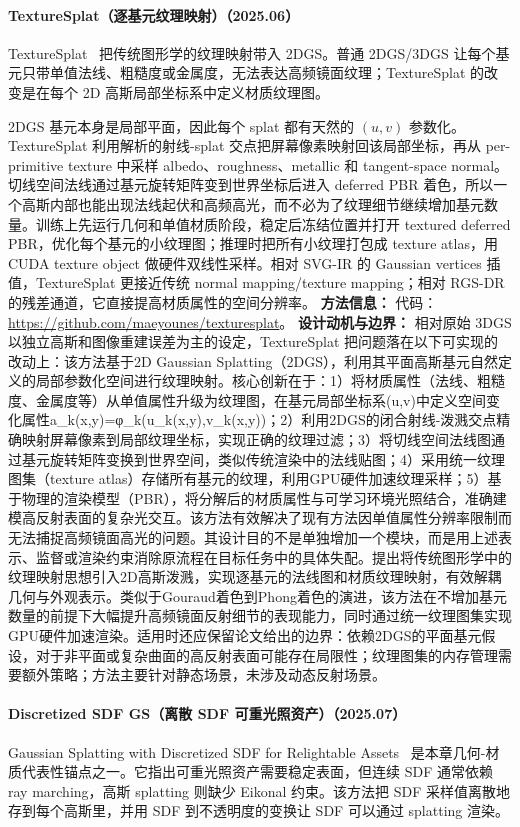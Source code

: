 \paragraph{TextureSplat（逐基元纹理映射）（2025.06）}
TextureSplat~\cite{2506_13348} 把传统图形学的纹理映射带入 2DGS。普通 2DGS/3DGS 让每个基元只带单值法线、粗糙度或金属度，无法表达高频镜面纹理；TextureSplat 的改变是在每个 2D 高斯局部坐标系中定义材质纹理图。

2DGS 基元本身是局部平面，因此每个 splat 都有天然的 $(u,v)$ 参数化。TextureSplat 利用解析的射线-splat 交点把屏幕像素映射回该局部坐标，再从 per-primitive texture 中采样 albedo、roughness、metallic 和 tangent-space normal。切线空间法线通过基元旋转矩阵变到世界坐标后进入 deferred PBR 着色，所以一个高斯内部也能出现法线起伏和高频高光，而不必为了纹理细节继续增加基元数量。训练上先运行几何和单值材质阶段，稳定后冻结位置并打开 textured deferred PBR，优化每个基元的小纹理图；推理时把所有小纹理打包成 texture atlas，用 CUDA texture object 做硬件双线性采样。相对 SVG-IR 的 Gaussian vertices 插值，TextureSplat 更接近传统 normal mapping/texture mapping；相对 RGS-DR 的残差通道，它直接提高材质属性的空间分辨率。
\textbf{方法信息：} 代码：\url{https://github.com/maeyounes/texturesplat}。
\textbf{设计动机与边界：} 相对原始 3DGS 以独立高斯和图像重建误差为主的设定，TextureSplat 把问题落在以下可实现的改动上：该方法基于2D Gaussian Splatting（2DGS），利用其平面高斯基元自然定义的局部参数化空间进行纹理映射。核心创新在于：1）将材质属性（法线、粗糙度、金属度等）从单值属性升级为纹理图，在基元局部坐标系(u,v)中定义空间变化属性a\_k(x,y)=φ\_k(u\_k(x,y),v\_k(x,y))；2）利用2DGS的闭合射线-泼溅交点精确映射屏幕像素到局部纹理坐标，实现正确的纹理过滤；3）将切线空间法线图通过基元旋转矩阵变换到世界空间，类似传统渲染中的法线贴图；4）采用统一纹理图集（texture atlas）存储所有基元的纹理，利用GPU硬件加速纹理采样；5）基于物理的渲染模型（PBR），将分解后的材质属性与可学习环境光照结合，准确建模高反射表面的复杂光交互。该方法有效解决了现有方法因单值属性分辨率限制而无法捕捉高频镜面高光的问题。其设计目的不是单独增加一个模块，而是用上述表示、监督或渲染约束消除原流程在目标任务中的具体失配。提出将传统图形学中的纹理映射思想引入2D高斯泼溅，实现逐基元的法线图和材质纹理映射，有效解耦几何与外观表示。类似于Gouraud着色到Phong着色的演进，该方法在不增加基元数量的前提下大幅提升高频镜面反射细节的表现能力，同时通过统一纹理图集实现GPU硬件加速渲染。适用时还应保留论文给出的边界：依赖2DGS的平面基元假设，对于非平面或复杂曲面的高反射表面可能存在局限性；纹理图集的内存管理需要额外策略；方法主要针对静态场景，未涉及动态反射场景。
\paragraph{Discretized SDF GS（离散 SDF 可重光照资产）（2025.07）}
Gaussian Splatting with Discretized SDF for Relightable Assets~\cite{2507_15629} 是本章几何-材质代表性锚点之一。它指出可重光照资产需要稳定表面，但连续 SDF 通常依赖 ray marching，高斯 splatting 则缺少 Eikonal 约束。该方法把 SDF 采样值离散地存到每个高斯里，并用 SDF 到不透明度的变换让 SDF 可以通过 splatting 渲染。

